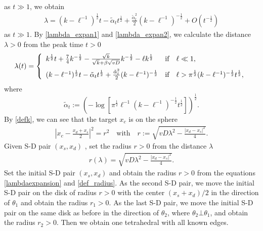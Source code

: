 \documentclass[10pt]{article}
\numberwithin{equation}{section}
\numberwithin{figure}{section}
\begin{document}
as $t \gg 1$, we obtain
\begin{equation}\label{lambda_expan2}
\begin{split}
\lambda = (k-\ell^{-1})^\frac{1}{2}t - \tilde \alpha_t t^\frac{1}{2} + \frac{\tilde\alpha_t^2}{2} (k-\ell^{-1})^{-\frac{1}{2}} + O\left( t^{-\frac{1}{2}} \right)
\end{split}
\end{equation}
as $t \gg 1$.
By \eqref{lambda_expan1} and \eqref{lambda_expan2}, we calculate
the distance $\lambda>0$ from the peak time $t>0$
\begin{equation}\label{lambdaexpansion}
\lambda(t) = \left\{
\begin{array}{ll}
k^\frac{1}{2}t + \frac{7}{4}k^{-\frac{1}{2}} - 
\frac{\sqrt{k}}{\sqrt{k} + \beta \sqrt{vD}}k^{-\frac{1}{2}}
-\ell k^\frac{1}{2} &  \mbox{if} \quad \ell \ll 1, \vspace{5pt} \\ 
(k-\ell^{-1})^\frac{1}{2}t - \tilde \alpha_t t^\frac{1}{2} + \frac{\tilde \alpha_t^2}{2} (k-\ell^{-1})^{-\frac{1}{2}}& 
\mbox{if} \quad \ell > \pi^{\frac{1}{2}} (k-\ell^{-1})^{-\frac{1}{2}} t^\frac{1}{2},
\end{array}
\right.
\end{equation}
where
\begin{equation}\label{defalphatilde}
\tilde \alpha_t:=
 \left(-\log\left[ \pi^{\frac{1}{2}} \ell^{-1} (k-\ell^{-1})^{-\frac{1}{2}} t^\frac{1}{2} \right] \right)^\frac{1}{2}.
\end{equation}
By \eqref{defk}, we can see that the target $x_c$ is on the sphere 
\begin{equation}
\begin{split}
\left|x_c - \frac{x_d + x_s}{2}\right|^2 
= r^2 \quad
\mbox{with} \quad 
r := \sqrt{vD\lambda^2
- \frac{|x_d - x_s|^2}{4}}. 
\end{split}
\end{equation}
Given S-D pair $(x_s, x_d)$ , set the radius $r>0$ from the distance $\lambda$
\begin{equation}\label{def_radius}
\begin{split}
r(\lambda) = \sqrt{vD\lambda^2 - \frac{|x_d - x_s|^2}{4}}. 
\end{split}
\end{equation}
Set the initial S-D pair $(x_s, x_d)$ and obtain the radius $r>0$ from the equations \eqref{lambdaexpansion} and \eqref{def_radius}. As the second S-D pair, we move the initial S-D pair on the disk of radius $r>0$ with the center $(x_s+x_d)/2$ in the direction of $\theta_1$ and obtain the radius $r_1>0$. As the last S-D pair, we move the initial S-D pair on the same disk as before in the direction of $\theta_2$, where $\theta_2 \bot \theta_1$, and obtain the radius $r_2>0$. Then we obtain one tetrahedral with all known edges. 
\end{document}
